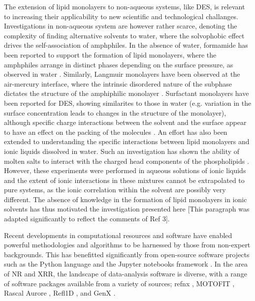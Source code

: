 \documentclass[amsmath,amssymb,twocolumn,superscriptaddress]{revtex4-1}
\begin{document}
The extension of lipid monolayers to non-aqueous systems, like DES, is relevant to increasing their applicability to new scientific and technological challanges.
Investigations in non-aqueous system are however rather scarce, denoting the complexity of finding alternative solvents to water, where the solvophobic effect drives the self-association of amphphiles.
In the absence of water, formamide has been reported to support the formation of lipid monolayers, where the amphphiles arrange in distinct phases depending on the surface pressure, as observed in water \cite{graner_phospholipidic_1995,weinbach_self-assembled_1993}.
Similarly, Langmuir monolayers have been observed at the air-mercury interface, where the intrinsic disordered nature of the subphase dictates the structure of the amphiphilic monolayer \cite{magnussen_self-assembly_1996,kraack_structure_2002}.
Surfactant monolayers have been reported for DES, showing similarites to those in water (e.g. variation in the surface concentration leads to changes in the structure of the monolayer), although specific charge interactions between the solvent and the surface appear to have an effect on the packing of the molecules \cite{arnold_surfactant_2015,sanchez-fernandez_self-assembly_2018}.
An effort has also been extended to understanding the specific interactions between lipid monolayers and ionic liquids dissolved in water.
Such an investigation has shown the ability of molten salts to interact with the charged head components of the phospholipids \cite{goncalves_da_silva_interaction_2018}.
However, these experiments were performed in aqueous solutions of ionic liquids and the extent of ionic interactions in these mixtures cannot be extrapolated to pure systems, as the ionic correlation within the solvent are possibly very different.
The absence of knowledge in the formation of lipid monolayers in ionic solvents has thus motivated the investigation presented here [This paragraph was adapted significantly to reflect the comments of Ref 3].

Recent developments in computational resources and software have enabled powerful methodologies and algorithms to be harnessed by those from non-expert backgrounds.
This has benefitted significantly from open-source software projects such as the Python language \cite{van_rossum_python_1995} and the Jupyter notebooks framework \cite{kluyver_jupyter_2016}.
In the area of NR and XRR, the landscape of data-analysis software is diverse, with a range of software packages available from a variety of sources; refnx \cite{nelson_refnx_2019,nelson_refnx_2018-1}, MOTOFIT \cite{nelson_co-refinement_2006}, Rascal \cite{hughes_rascal_nodate} Aurore \cite{gerelli_aurore_2016-1}, Refl1D \cite{kienzle_refl1d_2011}, and GenX \cite{bjorck_genx_2007}.
\end{document}
